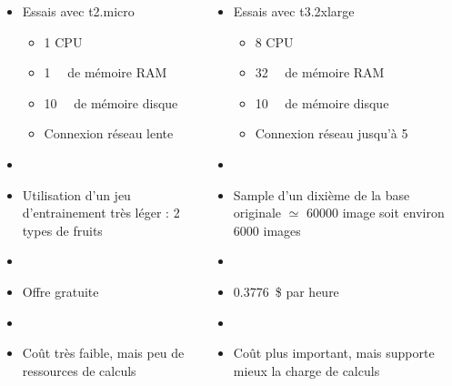 \documentclass[8pt,aspectratio=169,hyperref={unicode=true}]{beamer}
\begin{document}
\begin{frame}{\insertsection}
  \begin{columns}
    \begin{column}{.5\textwidth}
      \begin{itemize}
        \item Essais avec t2.micro
              \begin{itemize}
                \item 1 CPU
                \item \SI{1}{\giga\byte} de mémoire RAM
                \item \SI{10}{\giga\octet} de mémoire disque
                \item Connexion réseau lente
              \end{itemize}
        \item[]
        \item Utilisation d'un jeu d'entrainement très léger : 2 types de fruits
        \item[]
        \item Offre gratuite
        \item[]
        \item Coût très faible, mais peu de ressources de calculs
      \end{itemize}
    \end{column}
    \begin{column}{.5\textwidth}
      \begin{itemize}
        \item Essais avec t3.2xlarge
              \begin{itemize}
                \item 8 CPU
                \item \SI{32}{\giga\byte} de mémoire RAM
                \item \SI{10}{\giga\octet} de mémoire disque
                \item Connexion réseau jusqu'à \SI{5}{\giga\bit}
              \end{itemize}
        \item[]
        \item Sample d'un dixième de la base originale $\simeq$ 60000 image soit environ 6000 images
        \item[]
        \item \SI{0.3776}{\$} par heure
        \item[]
        \item Coût plus important, mais supporte mieux la charge de calculs
      \end{itemize}
    \end{column}
  \end{columns}
\end{frame}
\end{document}
